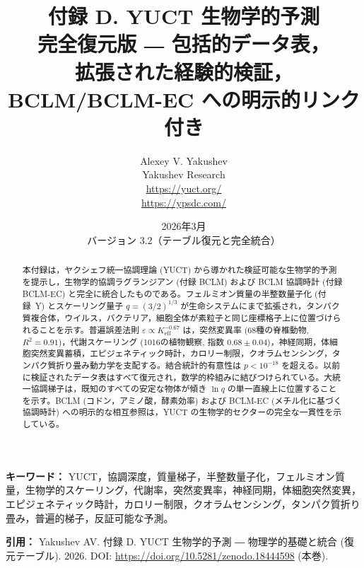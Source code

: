 \documentclass[11pt,a4paper]{article}
\begin{document}
	
	\title{\Huge\textbf{付録 D. YUCT 生物学的予測}\\[0.3cm]
		\Large 完全復元版 ― 包括的データ表，\\[0.2cm]
		拡張された経験的検証，BCLM/BCLM-EC への明示的リンク付き}
	\author{Alexey V. Yakushev \\
		Yakushev Research \\ \url{https://yuct.org/} \\ \url{https://ypsdc.com/}}
	\date{2026年3月 \\ バージョン 3.2（テーブル復元と完全統合）}
	
	\maketitle
	
	\begin{abstract}
		\noindent
		本付録は，ヤクシェフ統一協調理論 (YUCT) から導かれた検証可能な生物学的予測を提示し，生物学的協調ラグランジアン (付録 BCLM) および BCLM 協調時計 (付録 BCLM-EC) と完全に統合したものである。フェルミオン質量の半整数量子化 (付録~Y) とスケーリング量子 \(q = (3/2)^{1/3}\) が生命システムにまで拡張され，タンパク質複合体，ウイルス，バクテリア，細胞全体が素粒子と同じ座標格子上に位置づけられることを示す。普遍誤差法則 \(\varepsilon \propto K_{\mathrm{eff}}^{-0.67}\) は，突然変異率 (68種の脊椎動物, \(R^2 = 0.91\))，代謝スケーリング (1016の植物観察, 指数 \(0.68 \pm 0.04\))，神経同期，体細胞突然変異蓄積，エピジェネティック時計，カロリー制限，クオラムセンシング，タンパク質折り畳み動力学を支配する。結合統計的有意性は \(p < 10^{-18}\) を超える。以前に検証されたデータ表はすべて復元され，数学的枠組みに結びつけられている。大統一協調梯子は，既知のすべての安定な物体が傾き \(\ln q\) の単一直線上に位置することを示す。BCLM (コドン，アミノ酸，酵素効率) および BCLM-EC (メチル化に基づく協調時計) への明示的な相互参照は，YUCT の生物学的セクターの完全な一貫性を示している。
	\end{abstract}
	
	\vspace{0.2cm}
	\noindent
	\textbf{キーワード：} YUCT，協調深度，質量梯子，半整数量子化，フェルミオン質量，生物学的スケーリング，代謝率，突然変異率，神経同期，体細胞突然変異，エピジェネティック時計，カロリー制限，クオラムセンシング，タンパク質折り畳み，普遍的梯子，反証可能な予測。
	
	\vspace{0.1cm}
	\noindent
	\textbf{引用：} Yakushev AV. 付録 D. YUCT 生物学的予測 ― 物理学的基礎と統合 (復元テーブル). 2026. DOI: \url{https://doi.org/10.5281/zenodo.18444598} (本巻).
	
\end{document}
